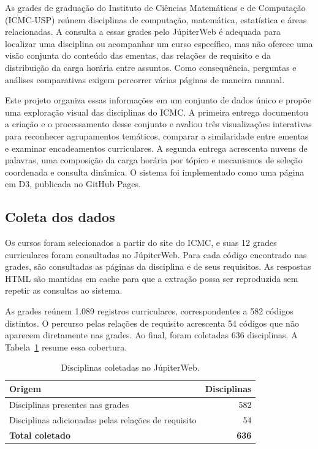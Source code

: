 \documentclass[
  12pt,
  oneside,
  a4paper,
  article,
  brazil
]{USPSC-classe/USPSC}
\begin{document}
As grades de graduação do Instituto de Ciências Matemáticas e de Computação
(ICMC-USP) reúnem disciplinas de computação, matemática, estatística e áreas
relacionadas. A consulta a essas grades pelo JúpiterWeb é adequada para localizar
uma disciplina ou acompanhar um curso específico, mas não oferece uma visão
conjunta do conteúdo das ementas, das relações de requisito e da distribuição da
carga horária entre assuntos. Como consequência, perguntas e análises
comparativas exigem percorrer várias páginas de maneira manual.

Este projeto organiza essas informações em um conjunto de dados único e propõe
uma exploração visual das disciplinas do ICMC. A primeira entrega documentou a
criação e o processamento desse conjunto e avaliou três visualizações
interativas para reconhecer agrupamentos temáticos, comparar a similaridade
entre ementas e examinar encadeamentos curriculares. A segunda entrega
acrescenta nuvens de palavras, uma composição da carga horária por tópico e
mecanismos de seleção coordenada e consulta dinâmica. O sistema foi
implementado como uma página em D3, publicada no GitHub Pages.

\subsection{Coleta dos dados}

Os cursos foram selecionados a partir do site do ICMC, e suas 12 grades
curriculares foram consultadas no JúpiterWeb. Para cada código encontrado nas
grades, são consultadas as páginas da disciplina e de seus requisitos.
As respostas HTML são mantidas em cache para que a extração possa ser
reproduzida sem repetir as consultas ao sistema.

As grades reúnem 1.089 registros curriculares, correspondentes a 582 códigos
distintos. O percurso pelas relações de requisito acrescenta 54 códigos que não
aparecem diretamente nas grades. Ao final, foram coletadas 636 disciplinas. A
Tabela~\ref{tab:cobertura} resume essa cobertura.

\begin{table}[htbp]
  \centering
  \caption{Disciplinas coletadas no JúpiterWeb.}
  \label{tab:cobertura}
  \begin{tabularx}{\linewidth}{>{\raggedright\arraybackslash}X r}
    \toprule
    \textbf{Origem} & \textbf{Disciplinas} \\
    \midrule
    Disciplinas presentes nas grades & 582 \\
    Disciplinas adicionadas pelas relações de requisito & 54 \\
    \textbf{Total coletado} & \textbf{636} \\
    \bottomrule
  \end{tabularx}
\end{table}
\end{document}
